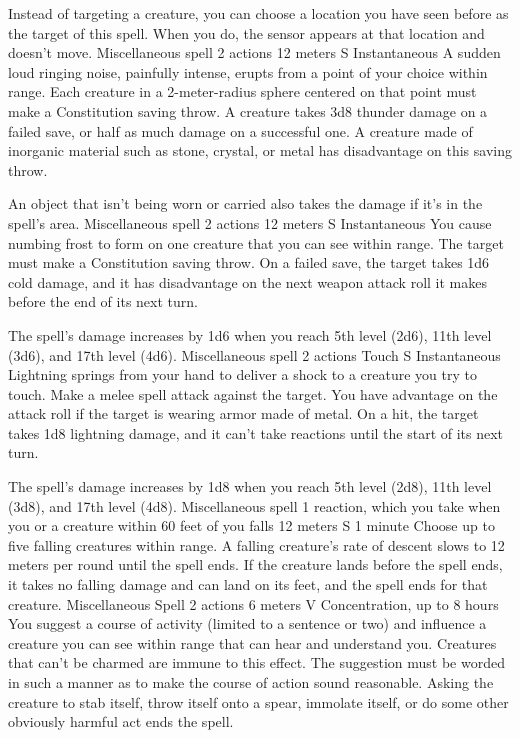     Instead of targeting a creature, you can choose a location you have seen before as the target of this spell.
    When you do, the sensor appears at that location and doesn't move.
    {Miscellaneous spell}
    {2 actions}
    {12 meters}
    {S}
    {Instantaneous}
    A sudden loud ringing noise, painfully intense, erupts from a point of your choice within range.
    Each creature in a 2-meter-radius sphere centered on that point must make a Constitution saving throw.
    A creature takes 3d8 thunder damage on a failed save, or half as much damage on a successful one.
    A creature made of inorganic material such as stone, crystal, or metal has disadvantage on this saving throw.

    An object that isn't being worn or carried also takes the damage if it's in the spell's area.
    {Miscellaneous spell}
    {2 actions}
    {12 meters}
    {S}
    {Instantaneous}
    You cause numbing frost to form on one creature that you can see within range.
    The target must make a Constitution saving throw.
    On a failed save, the target takes 1d6 cold damage, and it has disadvantage on the next weapon attack roll it makes before the end of its next turn.

    The spell's damage increases by 1d6 when you reach 5th level (2d6), 11th level (3d6), and 17th level (4d6).
    {Miscellaneous spell}
    {2 actions}
    {Touch}
    {S}
    {Instantaneous}
    Lightning springs from your hand to deliver a shock to a creature you try to touch.
    Make a melee spell attack against the target.
    You have advantage on the attack roll if the target is wearing armor made of metal.
    On a hit, the target takes 1d8 lightning damage, and it can't take reactions until the start of its next turn.

    The spell's damage increases by 1d8 when you reach 5th level (2d8), 11th level (3d8), and 17th level (4d8).
    {Miscellaneous spell}
    {1 reaction, which you take when you or a creature within 60 feet of you falls}
    {12 meters}
    {S}
    {1 minute}
    Choose up to five falling creatures within range.
    A falling creature's rate of descent slows to 12 meters per round until the spell ends.
    If the creature lands before the spell ends, it takes no falling damage and can land on its feet, and the spell ends for that creature.
    {Miscellaneous Spell}
    {2 actions}
    {6 meters}
    {V}
    {Concentration, up to 8 hours}
    You suggest a course of activity (limited to a sentence or two) and influence a creature you can see within range that can hear and understand you.
    Creatures that can't be charmed are immune to this effect.
    The suggestion must be worded in such a manner as to make the course of action sound reasonable.
    Asking the creature to stab itself, throw itself onto a spear, immolate itself, or do some other obviously harmful act ends the spell.

